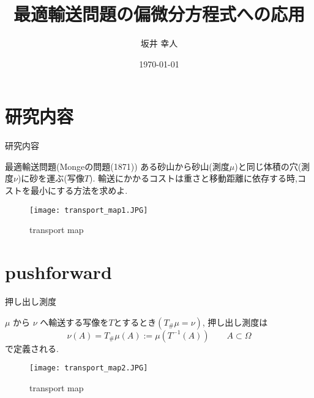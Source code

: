 \documentclass[aspectratio=169, dvipdfmx, 12pt]{beamer}
\title{最適輸送問題の偏微分方程式への応用}
\author[坂井 幸人]{坂井 幸人}
\institute[数物科学専攻 1年]{数物科学専攻 1年}
\date{\today}
\begin{document}
\frame{\maketitle}


\begin{comment}
\begin{frame}{目次}
    \tableofcontents
\end{frame}
\end{comment}


\section{研究内容}
\begin{frame}{研究内容}
    \begin{block}{最適輸送問題(Mongeの問題(1871))}
        ある砂山から砂山(測度$\mu$)と同じ体積の穴(測度$\nu$)に砂を運ぶ(写像$T$).
        輸送にかかるコストは重さと移動距離に依存する時,コストを最小にする方法を求めよ.
    \end{block}
\begin{figure}[htbp]
	\begin{center}
        \texttt{[image: transport\_map1.JPG]}
        \caption{transport map}
	\end{center}
\end{figure}


\end{frame}

\section{pushforward}
\begin{frame}{押し出し測度}
    
    \begin{definition}
        $\mu$ から $\nu$ へ輸送する写像を$T$とするとき$(T_\#\mu = \nu)$,
        押し出し測度は
        \begin{equation*}
            \nu (A) =  T_\#\mu (A) := \mu (T^{-1} (A)) \qquad A \subset \Omega
        \end{equation*}
        で定義される.
    \end{definition}

    \begin{figure}[htbp]
        \begin{center}
            \texttt{[image: transport\_map2.JPG]}
            \caption{transport map}
        \end{center}
    \end{figure}
\end{frame}
\end{document}
